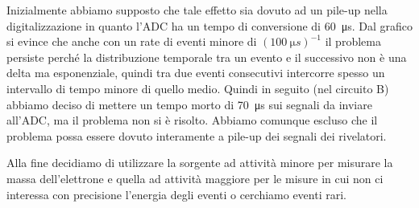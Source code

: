 Inizialmente abbiamo supposto che tale effetto sia dovuto ad un pile-up nella digitalizzazione in quanto l'ADC ha un tempo di conversione di \SI{60}{\micro s}.
Dal grafico si evince che anche con un rate di eventi minore di $(\SI{100}{\micro s})^{-1}$ il problema persiste perché la distribuzione temporale tra un evento e il successivo non è una delta ma esponenziale, quindi tra due eventi consecutivi intercorre spesso un intervallo di tempo minore di quello medio.
Quindi in seguito (nel circuito B) abbiamo deciso di mettere un tempo morto di \SI{70}{\micro s} sui segnali da inviare all'ADC, ma il problema non si è risolto.
Abbiamo comunque escluso che il problema possa essere dovuto interamente a pile-up dei segnali dei rivelatori.

Alla fine decidiamo di utilizzare la sorgente ad attività minore per misurare la massa dell'elettrone e quella ad attività maggiore per le misure in cui non ci interessa con precisione l'energia degli eventi o cerchiamo eventi rari.